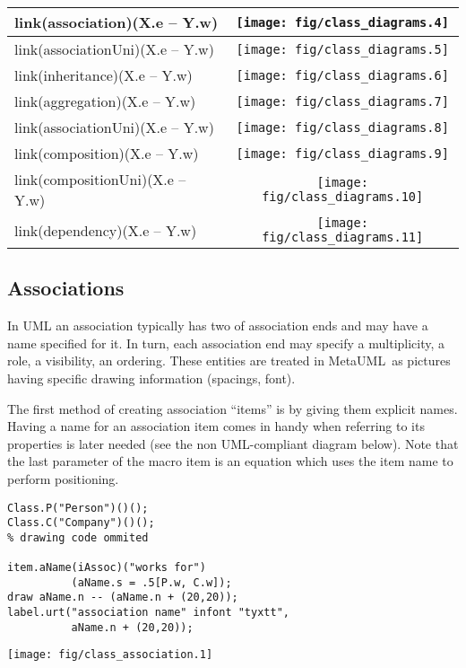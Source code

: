 \documentclass{article}
\newcommand{\code}{\ttfamily}
\newcommand{\metauml}{MetaUML}
\begin{document}
\begin{tabular}{||l|c||}
\hline
{\code link(association)(X.e -- Y.w)} & \texttt{[image: fig/class\_diagrams.4]} \\
\hline
{\code link(associationUni)(X.e -- Y.w)} & \texttt{[image: fig/class\_diagrams.5]}  \\
\hline
{\code link(inheritance)(X.e -- Y.w)} & \texttt{[image: fig/class\_diagrams.6]} \\
\hline
{\code link(aggregation)(X.e -- Y.w)} & \texttt{[image: fig/class\_diagrams.7]} \\
\hline
{\code link(associationUni)(X.e -- Y.w)} & \texttt{[image: fig/class\_diagrams.8]} \\
\hline
{\code link(composition)(X.e -- Y.w)} & \texttt{[image: fig/class\_diagrams.9]} \\
\hline
{\code link(compositionUni)(X.e -- Y.w)} & \texttt{[image: fig/class\_diagrams.10]} \\
\hline
{\code link(dependency)(X.e -- Y.w)} & \texttt{[image: fig/class\_diagrams.11]} \\
\hline
\end{tabular}

\subsection{Associations}
In UML an association typically has two of association ends and may have a name specified for it.
In turn, each association end may specify a multiplicity, a role, a visibility, an ordering.
These entities are treated in \metauml\ as pictures having specific drawing information
(spacings, font).

The first method of creating association ``items'' is by giving them explicit names.
Having a name for an association item comes in handy when referring to its properties
is later needed (see the non UML-compliant diagram below). Note that the last parameter of the macro {\code item} is an equation which uses the item name to perform positioning.

\begin{multicols}{2}
\begin{verbatim}
Class.P("Person")()();
Class.C("Company")()();
% drawing code ommited

item.aName(iAssoc)("works for")
          (aName.s = .5[P.w, C.w]);
draw aName.n -- (aName.n + (20,20));
label.urt("association name" infont "tyxtt",
          aName.n + (20,20));
\end{verbatim}
\columnbreak
\hspace{1cm}\texttt{[image: fig/class\_association.1]}
\end{multicols}
\end{document}
